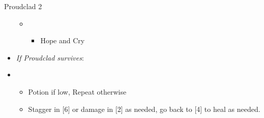 \begin{battle}[2:01]{Proudclad 2}
\begin{itemize}
\begin{itemize}
\begin{itemize}
				            \end{itemize}
				      \item \second
				            \begin{itemize}
					            \item Hope and Cry
				            \end{itemize}
			      \end{itemize}
			\item \textit{If Proudclad survives}:
			\item \fourth
			      \begin{itemize}
				      \item Potion if low, Repeat otherwise
				      \item Stagger in [6] or damage in [2] as needed, go back to [4] to heal as needed.
			      \end{itemize}
		\end{itemize}
\end{battle}